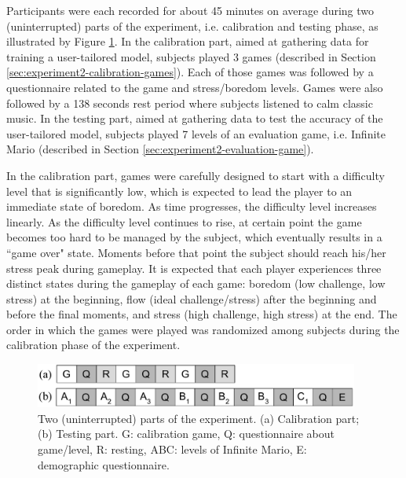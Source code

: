 Participants were each recorded for about 45 minutes on average during two (uninterrupted) parts of the experiment, i.e. calibration and testing phase, as illustrated by Figure \ref{fig:experiment2-parts}. In the calibration part, aimed at gathering data for training a user-tailored model, subjects played 3 games (described in Section \ref{sec:experiment2-calibration-games}). Each of those games was followed by a questionnaire related to the game and stress/boredom levels. Games were also followed by a 138 seconds rest period where subjects listened to calm classic music. In the testing part, aimed at gathering data to test the accuracy of the user-tailored model, subjects played 7 levels of an evaluation game, i.e. Infinite Mario (described in Section \ref{sec:experiment2-evaluation-game}).

In the calibration part, games were carefully designed to start with a difficulty level that is significantly low, which is expected to lead the player to an immediate state of boredom. As time progresses, the difficulty level increases linearly. As the difficulty level continues to rise, at certain point the game becomes too hard to be managed by the subject, which eventually results in a ``game over" state. Moments before that point the subject should reach his/her stress peak during gameplay. It is expected that each player experiences three distinct states during the gameplay of each game: boredom (low challenge, low stress) at the beginning, flow (ideal challenge/stress) after the beginning and before the final moments, and stress (high challenge, high stress) at the end. The order in which the games were played was randomized among subjects during the calibration phase of the experiment.

\begin{figure}[ht]
  \centering
  \includegraphics[width=0.95\textwidth]{figures/experiment2-parts}
  \caption{Two (uninterrupted) parts of the experiment. (a) Calibration part; (b) Testing part. G: calibration game, Q: questionnaire about game/level, R: resting, ABC: levels of Infinite Mario, E: demographic questionnaire.}
  \label{fig:experiment2-parts}
\end{figure}


